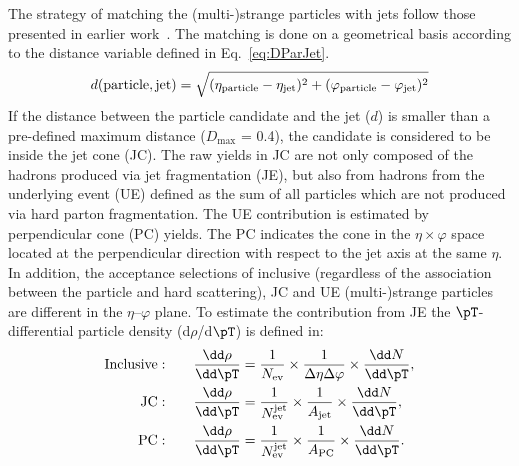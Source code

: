 \documentclass[ALICE,manyauthors]{cernphprep}
\begin{document}
The strategy of matching the (multi-)strange particles with jets follow those presented in earlier work~\cite{Acharya:2021oaa}.
The matching is done on a geometrical basis according to the distance variable defined in Eq.~\ref{eq:DParJet}.
\begin{equation}
d(\mathrm{particle, jet}) = \sqrt{(\eta_\mathrm{particle} -\eta_{\rm jet})^{2} + (\varphi_\mathrm{particle} -\varphi_{\rm jet})^{2}}
\label{eq:DParJet}
\end{equation}
If the distance between the particle candidate and the jet ($d$) is smaller than a pre-defined maximum distance ($D_\mathrm{max}$ = 0.4), the candidate is considered to be inside the jet cone (JC).
The raw yields in JC are not only composed of the hadrons produced via jet fragmentation (JE), but also from hadrons from the underlying event (UE) defined as the sum of all particles which are not produced via hard parton fragmentation.
The UE contribution is estimated by perpendicular cone (PC) yields.
The PC indicates the cone in the $\eta \times \varphi$ space located at the perpendicular direction with respect to the jet axis at the same $\eta$.
In addition, the acceptance selections of inclusive (regardless of the association between the particle and hard scattering), JC and UE (multi-)strange particles are different in the $\eta$--$\varphi$ plane.
To estimate the contribution from JE the $\pT$-differential particle density (d$\rho$/d$\pT$) is defined in:
\begin{equation}
\begin{split}
{\rm Inclusive:}\qquad & \frac{\dd\rho}{\dd\pT} = \frac{1}{N_{\rm ev}}\times\frac{1}{\Delta\eta\Delta\varphi}\times\frac{\dd N}{\dd\pT}, \\
{\rm JC:}\qquad & \frac{\dd\rho}{\dd\pT} = \frac{1}{N_{\rm ev}^{\rm jet}} \times\frac{1}{A_{\rm jet}}\times\frac{\dd N}{\dd\pT}, \\
{\rm PC:}\qquad & \frac{\dd\rho}{\dd\pT} = \frac{1}{N_{\rm ev}^{\rm jet}} \times\frac{1}{A_{\rm PC}}\times\frac{\dd N}{\dd\pT}. \\
\end{split}
\label{eq:normalize}
\end{equation}
\end{document}
